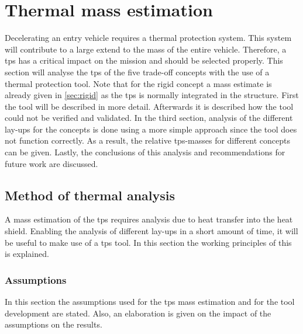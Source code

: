 \section{Thermal mass estimation}
\label{ch:thermtool}
Decelerating an entry vehicle requires a thermal protection system. This system will contribute to a large extend to the mass of the entire vehicle. Therefore, a \acrfull{tps} has a critical impact on the mission and should be selected properly. This section will analyse the \gls{tps} of the five trade-off concepts with the use of a thermal protection tool. Note that for the rigid concept a mass estimate is already given in \ref{sec:rigid} as the \gls{tps} is normally integrated in the structure. First the tool will be described in more detail. Afterwards it is described how the tool could not be verified and validated. In the third section, analysis of the different lay-ups for the concepts is done using a more simple approach since the tool does not function correctly. As a result, the relative \gls{tps}-masses for different concepts can be given. Lastly, the conclusions of this analysis and recommendations for future work are discussed.

\subsection{Method of thermal analysis}
A mass estimation of the \gls{tps} requires analysis due to heat transfer into the heat shield. Enabling the analysis of different lay-ups in a short amount of time, it will be useful to make use of a \gls{tps} tool. In this section the working principles of this is explained.

\subsubsection{Assumptions}
In this section the assumptions used for the \gls{tps} mass estimation and for the tool development are stated. Also, an elaboration is given on the impact of the assumptions on the results.

